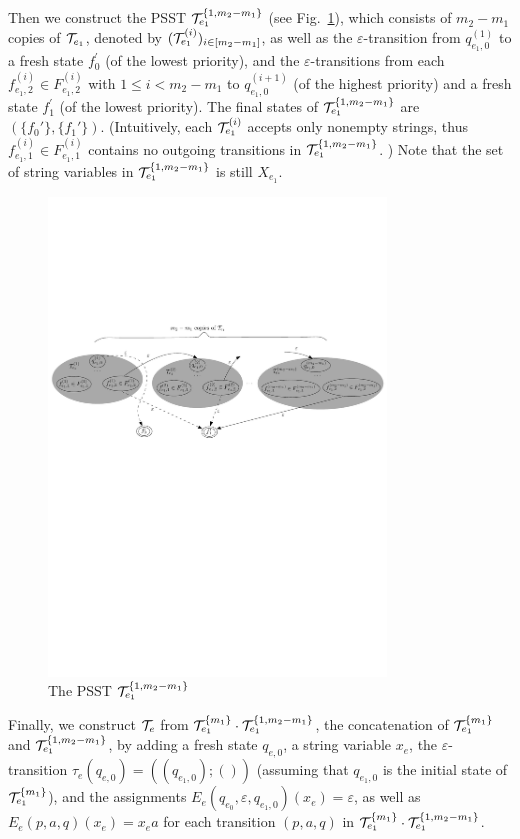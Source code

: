 Then we construct the PSST $\mathcal{T}^{\{1,m_2-m_1\}}_{e_1}$ (see Fig.~\ref{fig-reg2pfa-4}), which consists of $m_2-m_1$ copies of $\mathcal{T}_{e_1}$, denoted by $(\mathcal{T}^{(i)}_{e_1})_{i \in [m_2-m_1]}$, as well as the $\varepsilon$-transition from $q^{(1)}_{e_1,0}$ to a fresh state $f^\prime_0$ (of the lowest priority), and the $\varepsilon$-transitions from each $f^{(i)}_{e_1,2} \in F^{(i)}_{e_1,2}$ with $1\le i < m_2-m_1$ to $q^{(i+1)}_{e_1,0}$ (of the highest priority) and a fresh state $f^\prime_1$ (of the lowest priority). The final states of $\mathcal{T}^{\{1,m_2-m_1\}}_{e_1}$ are $(\{f_0'\},\{f_1'\})$. (Intuitively, each $\mathcal{T}^{(i)}_{e_1}$ accepts only nonempty strings, thus $f^{(i)}_{e_1,1} \in F^{(i)}_{e_1,1}$ contains no outgoing transitions in $\mathcal{T}^{\{1,m_2-m_1\}}_{e_1}$. ) Note that the set of string variables in $\mathcal{T}^{\{1,m_2-m_1\}}_{e_1}$ is still $X_{e_1}$.
		\begin{figure}[ht]
			\centering
			\includegraphics[width = 0.8\textwidth]{reg2pfa-4.pdf}
			\caption{The PSST $\mathcal{T}^{\{1,m_2-m_1\}}_{e_1}$}
			\label{fig-reg2pfa-4}
		\end{figure}  

Finally, we construct $\mathcal{T}_e$ from $\mathcal{T}^{\{m_1\}}_{e_1} \cdot \mathcal{T}^{\{1,m_2-m_1\}}_{e_1}$, the concatenation of $\mathcal{T}^{\{m_1\}}_{e_1}$ and $\mathcal{T}^{\{1,m_2-m_1\}}_{e_1}$, by adding a fresh state $q_{e,0}$, a string variable $x_e$, the $\varepsilon$-transition $\tau_e(q_{e,0}) = ((q_{e_1,0});())$ (assuming that $q_{e_1,0}$ is the initial state of $\mathcal{T}^{\{m_1\}}_{e_1}$),  and the assignments $E_e(q_{e_0}, \varepsilon, q_{e_1,0})(x_e) = \varepsilon$, as well as $E_e(p, a, q)(x_e) = x_e a$ for each transition $(p, a, q)$ in  $\mathcal{T}^{\{m_1\}}_{e_1} \cdot \mathcal{T}^{\{1,m_2-m_1\}}_{e_1}$.

